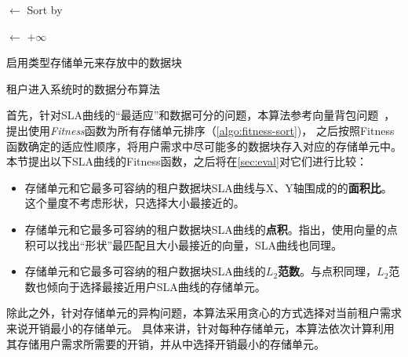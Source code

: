 \IncMargin{1em}
\begin{algorithm}[h]
  \SetAlgoLined
  \BlankLine

  \Suitable$\leftarrow$  \;%
  Sort \Suitable by \Fitness \; \label{algo:fitness-sort}


  
  \BestCost $\leftarrow$ $+\infty$


  启用\BestType 类型存储单元来存放\Request 中的数据块 \;

  \caption{租户进入系统时的数据分布算法}
  \label{algo:tenant-allocation}
\end{algorithm}
\DecMargin{1em}

首先，针对SLA曲线的“最适应”和数据可分的问题，本算法参考向量背包问题~\cite{panigrahy2011heuristics}，提出使用\textit{Fitness}函数为所有存储单元排序（\autoref{algo:fitness-sort})，
之后按照Fitness函数确定的适应性顺序，将用户需求中尽可能多的数据块存入对应的存储单元中。
本节提出以下SLA曲线的Fitness函数，之后将在\autoref{sec:eval}对它们进行比较：

\begin{itemize}
  \item 存储单元和它最多可容纳的租户数据块SLA曲线与X、Y轴围成的的\textbf{面积比}。这个量度不考虑形状，只选择大小最接近的。
  \item 存储单元和它最多可容纳的租户数据块SLA曲线的\textbf{点积}。\citet{panigrahy2011heuristics,gabay2016vector}指出，使用向量的点积可以找出“形状”最匹配且大小最接近的向量，SLA曲线也同理。
  \item 存储单元和它最多可容纳的租户数据块SLA曲线的\textbf{$L_2$范数}。与点积同理，$L_2$范数也倾向于选择最接近用户SLA曲线的存储单元。
\end{itemize}

除此之外，针对存储单元的异构问题，本算法采用贪心的方式选择对当前租户需求来说开销最小的存储单元。
具体来讲，针对每种存储单元，本算法依次计算利用其存储用户需求所需要的开销，并从中选择开销最小的存储单元。
